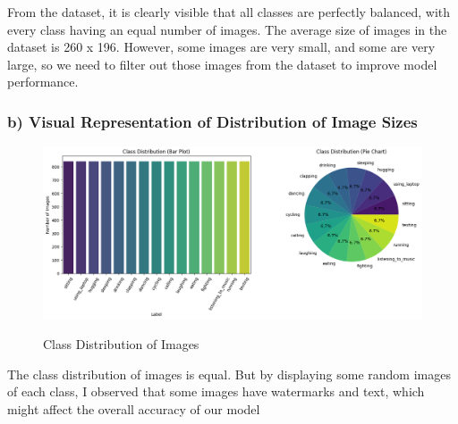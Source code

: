 \documentclass{article}
\begin{document}
From the dataset, it is clearly visible that all classes are perfectly balanced, with every class having an equal number of images. The average size of images in the dataset is 260 x 196. However, some images are very small, and some are very large, so we need to filter out those images from the dataset to improve model performance.

\vspace{20pt}
\subsubsection*{b) Visual Representation of Distribution of Image Sizes}
\begin{figure}[H] %
    \centering
    \begin{minipage}{0.75\linewidth}
        \centering
        \includegraphics[scale=0.4]{assets/1b.png}
        \caption{Class Distribution of Images}{}
        \label{fig:1b}
    \end{minipage}
\end{figure}
\hspace{-3pt}
The class distribution of images is equal. But by displaying some random images of each class, I observed that some images have watermarks and text, which might affect the overall accuracy of our model

\vspace{30pt}
\end{document}
